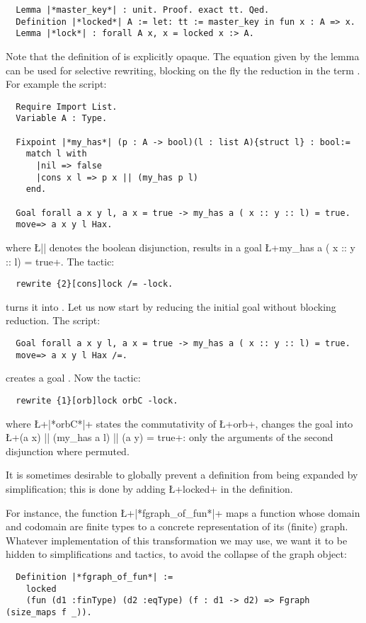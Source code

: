 \begin{lstlisting}
  Lemma |*master_key*| : unit. Proof. exact tt. Qed.
  Definition |*locked*| A := let: tt := master_key in fun x : A => x.
  Lemma |*lock*| : forall A x, x = locked x :> A.
\end{lstlisting}
Note that the definition of  is explicitly opaque.
The equation  given by the  lemma can be used
for selective rewriting, blocking on the fly the reduction in the
term .
For example the script:
\begin{lstlisting}
  Require Import List.
  Variable A : Type.

  Fixpoint |*my_has*| (p : A -> bool)(l : list A){struct l} : bool:=
    match l with
      |nil => false
      |cons x l => p x || (my_has p l)
    end.

  Goal forall a x y l, a x = true -> my_has a ( x :: y :: l) = true.
  move=> a x y l Hax.
\end{lstlisting}
where \L{||} denotes the boolean disjunction, results in a goal
\L+my_has a ( x :: y :: l) = true+. The tactic:
\begin{lstlisting}
  rewrite {2}[cons]lock /= -lock.
\end{lstlisting}
turns it into .
Let us now start by reducing the initial goal without blocking reduction.
The script:
\begin{lstlisting}
  Goal forall a x y l, a x = true -> my_has a ( x :: y :: l) = true.
  move=> a x y l Hax /=.
\end{lstlisting}
creates a goal . Now the
tactic:
\begin{lstlisting}
  rewrite {1}[orb]lock orbC -lock.
\end{lstlisting}
where \L+|*orbC*|+ states the commutativity of \L+orb+, changes the
goal into\\ \L+(a x) || (my_has a l) || (a y) = true+: only the
arguments of the second disjunction where permuted.


It is sometimes desirable to globally prevent a definition from being
expanded by simplification; this is done by adding \L+locked+ in the
definition.

For instance, the function \L+|*fgraph_of_fun*|+ maps a function whose
domain and codomain are finite types to a concrete representation of
its (finite) graph. Whatever implementation of this transformation we
may use, we want it to be hidden to simplifications and tactics, to
avoid the collapse of the graph object:
\begin{lstlisting}
  Definition |*fgraph_of_fun*| :=
    locked
    (fun (d1 :finType) (d2 :eqType) (f : d1 -> d2) => Fgraph (size_maps f _)).
\end{lstlisting}


